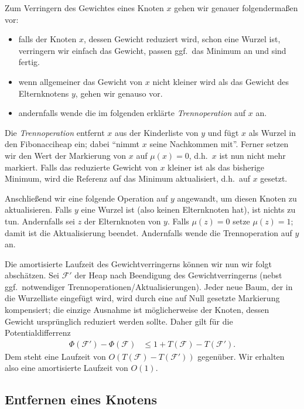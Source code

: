 \documentclass[10pt,reqno]{amsart}
\numberwithin{equation}{section}
\newcommand\cF{\mathcal F}
\begin{document}
Zum Verringern des Gewichtes eines Knoten $x$ gehen wir genauer folgenderma\ss en vor:
			\begin{itemize}
				\item falls der Knoten $x$, dessen Gewicht reduziert wird, schon eine Wurzel ist, verringern wir einfach das Gewicht, passen ggf.\ das Minimum an und sind fertig.
				\item wenn allgemeiner das Gewicht von $x$ nicht kleiner wird als das Gewicht des Elternknotens $y$, gehen wir genauso vor.
				\item andernfalls wende die im folgenden erkl\"arte {\em Trennoperation} auf $x$ an.
			\end{itemize}

			Die {\em Trennoperation} entfernt $x$ aus der Kinderliste von $y$ und f\"ugt $x$ als Wurzel in den Fibonacciheap ein; dabei ``nimmt $x$ seine Nachkommen mit''.
			Ferner setzen wir den Wert der Markierung von $x$ auf $\mu(x)=0$, d.h.\ $x$ ist nun nicht mehr markiert.
Falls das reduzierte Gewicht von $x$ kleiner ist als das bisherige Minimum, wird die Referenz auf das Minimum aktualisiert, d.h.\ auf $x$ gesetzt.

Anschlie\ss end wir eine folgende Operation auf $y$ angewandt, um diesen Knoten zu aktualisieren.
Falls $y$ eine Wurzel ist (also keinen Elternknoten hat), ist nichts zu tun.
Andernfalls sei $z$ der Elternknoten von $y$.
Falls $\mu(z)=0$ setze $\mu(z)=1$; damit ist die Aktualisierung beendet.
Andernfalls wende die Trennoperation auf $y$ an.

Die amortisierte Laufzeit des Gewichtverringerns k\"onnen wir nun wir folgt absch\"atzen.
Sei $\cF'$ der Heap nach Beendigung des Gewichtverringerns (nebst ggf.\ notwendiger Trennoperationen/Aktualisierungen).
Jeder neue Baum, der in die Wurzelliste eingef\"ugt wird, wird durch eine auf Null gesetzte Markierung kompensiert; die einzige Ausnahme ist m\"oglicherweise der Knoten, dessen Gewicht urspr\"unglich reduziert werden sollte.
Daher gilt f\"ur die Potentialdifferrenz
\begin{align}\label{eq_fibo_reduce}
	\Phi(\cF')-\Phi(\cF)&\leq 1+T(\cF)-T(\cF').
\end{align}
Dem steht eine Laufzeit von $O(T(\cF)-T(\cF'))$ gegen\"uber.
Wir erhalten also eine amortisierte Laufzeit von $O(1)$.


\subsection{Entfernen eines Knotens}\label{sec_fibo_remove}
\end{document}
